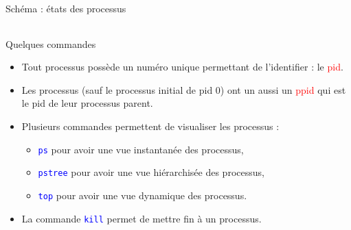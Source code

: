 \documentclass[10pt]{beamer}
\begin{document}
\begin{frame}
\begin{block}{Schéma : états des processus}
\begin{center}
\begin{tabularx}{0.9\textwidth}{YYY}
			\end{tabularx}
		\end{center}
	\end{block}
\end{frame}

\begin{frame}
	\mframe{\Processus}
	\begin{block}{Quelques commandes}
		\begin{itemize}
			\item<2-> Tout processus possède un numéro unique permettant de l'identifier : le \textcolor{red}{{\sc pid}}.
			\item<3-> Les processus (sauf le processus initial de {\sc pid} 0) ont un aussi un \textcolor{red}{{\sc ppid}} qui est le {\sc pid} de leur processus parent.
			\item<4-> Plusieurs commandes permettent de visualiser les processus :
			\begin{itemize}
				\item<5-> \textcolor{blue}{\tt ps} pour avoir une vue instantanée des processus,
				\item<6-> \textcolor{blue}{\tt pstree} pour avoir une vue hiérarchisée des processus,
				\item<7-> \textcolor{blue}{\tt top} pour avoir une vue dynamique des processus.
			\end{itemize}
			\item<8-> La commande \textcolor{blue}{\tt kill} permet de mettre fin à un processus.
		\end{itemize}
	\end{block}
\end{frame}
\end{document}
